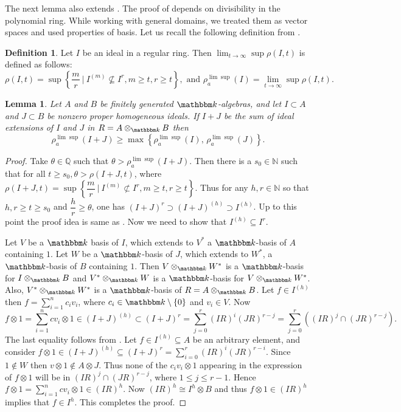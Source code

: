 \documentclass[12pt]{amsart}
\numberwithin{equation}{section}
\newtheorem{lemma}[theorem]{Lemma}
\theoremstyle{definition}
\newtheorem{definition}[theorem]{Definition}
\newcommand{\NN}{{\mathbb N}}
\newcommand{\QQ}{{\mathbb Q}}
\newcommand{\kk}{{\mathbbm k}}
\begin{document}
The next lemma also extends  \cite[Lemma 2.4]{fiberprojective}. The proof of \cite[Lemma 2.4]{fiberprojective} depends on divisibility in the polynomial ring. While working with general domains, we treated them as vector spaces and used properties of basis. Let us recall the following definition from \cite{guardo2013asymptotic}.  
\begin{definition}
    Let $I$ be an ideal in a regular ring. Then $\lim_{t\to \infty} \sup \rho(I,t) $ is defined as follows: $$\rho(I,t)=\sup \left\{\dfrac{m}{r}~|~I^{(m)} \not\subseteq I^r, m \geqslant t, r \geqslant t\right\}, \text{ and }\rho^{\lim\sup}_a(I)=\lim_{t\to \infty} \sup \rho(I,t). $$
\end{definition}

	\begin{lemma} \label{lemma: a-resurgence of  I +J > a -sup resurgence}
		Let $A$ and $B$ be finitely generated $\kk$-algebras, and let $I \subset A$ and $J \subset B$ be nonzero proper homogeneous ideals. If  $I + J$ be the sum of ideal extensions of $I$ and $J$ in $R = A \otimes_\kk B$ then
$$
	\rho_a^{\lim \sup}(I + J) \geqslant {\max}  \left\{ \rho_a^{{\lim \sup}}(I), \, \rho_a^{{\lim \sup}}(J) \right\}. 
$$
	\end{lemma}
	\begin{proof}
		Take $\theta \in \QQ$ such that $\theta>\rho_a^{\lim \sup}(I + J) $.  Then there is a $s_0\in \NN$ such that for all $t\geqslant s_0, \theta >\rho(I+J,t)$, where $\rho(I+J,t)=\sup \left\{\dfrac{m}{r} ~|~I^{(m)}\not\subset I^r, m \geqslant t, r \geqslant t \right\}$.  Thus for any $h,r \in \NN$ so that $h,r\geqslant t\geqslant s_0$ and $\dfrac{h}{r}\geqslant \theta$, one has $(I+J)^r \supset (I+J)^{(h)} \supset I^{(h)} $. 
		Up to this  point  the proof idea is same as \cite[Lemma 2.4]{fiberprojective}. Now we need to show  that $I^{(h)} \subseteq I^r$.
		
      Let $V$ be a $\kk$ basis of $I$, which extends to $V^*$ a $\kk$-basis of $A$ containing $1$. Let $W$ be a $\kk$-basis of $J$, which extends to $W^*$, a $\kk$-basis of $B$ containing $1$. Then $V\otimes_{\kk} W^*$ is a $\kk$-basis for $I\otimes_{\kk} B$ and $V^*\otimes_{\kk} W$ is a $\kk$-basis for $V\otimes_{\kk} W^*$. Also, $V^*\otimes_{\kk} W^*$ is a $\kk$-basis of $R=A\otimes_{\kk} B$.
       Let $f\in I^{(h)}$ then $f=\sum_{i=1}^n c_iv_i $, where $c_i\in \kk\setminus \{0\}$ and $v_i\in V$.
       Now $$f\otimes 1 =\sum_{i=1}^ncv_i\otimes 1 \in (I+J)^{(h)}\subset (I+J)^r=\sum_{j=0}^r (IR)^i(JR)^{r-j}= \sum_{j=0}^r \left((IR)^j\cap(JR)^{r-j}\right).$$ The last equality follows from \cite[Lemma 3.1]{ha2020symbolic}. 
		Let $f \in I^{(h)} \subseteq A$ be an arbitrary element, and consider $f \otimes 1 \in (I + J)^{(h)} \subseteq (I + J)^r = \sum_{i=0}^{r} (IR)^i (JR)^{r-i}$. Since $1\notin W  $ then $v\otimes 1 \notin A\otimes J$. Thus none of the $c_iv_i\otimes1$ appearing in the expression of $f\otimes 1$ will be in $ (IR)^j\cap(JR)^{r-j} $, where $1\leqslant j \leqslant r-1$. Hence $f\otimes1 = \sum_{i=1}^ncv_i\otimes 1 \in (IR)^h$. 
		Now $(IR)^h \cong I^h \otimes B$ and thus $f\otimes 1 \in (IR)^h $ implies that $f\in I^h$. This completes the proof. 
\end{proof}
\end{document}
